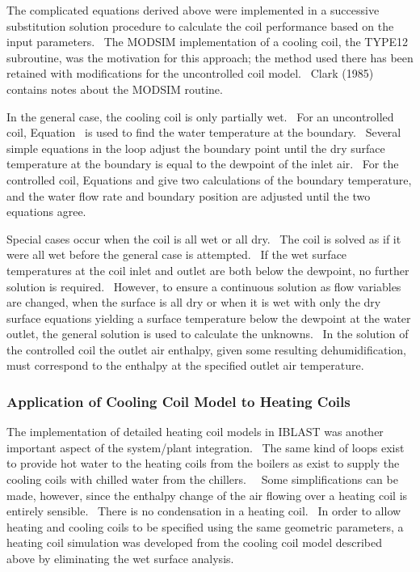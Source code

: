 The complicated equations derived above were implemented in a successive substitution solution procedure to calculate the coil performance based on the input parameters.~ The MODSIM implementation of a cooling coil, the TYPE12 subroutine, was the motivation for this approach; the method used there has been retained with modifications for the uncontrolled coil model.~ Clark (1985) contains notes about the MODSIM routine.

In the general case, the cooling coil is only partially wet.~ For an uncontrolled coil, Equation~ is used to find the water temperature at the boundary.~ Several simple equations in the loop adjust the boundary point until the dry surface temperature at the boundary is equal to the dewpoint of the inlet air.~ For the controlled coil, Equations and give two calculations of the boundary temperature, and the water flow rate and boundary position are adjusted until the two equations agree.

Special cases occur when the coil is all wet or all dry.~ The coil is solved as if it were all wet before the general case is attempted.~ If the wet surface temperatures at the coil inlet and outlet are both below the dewpoint, no further solution is required.~ However, to ensure a continuous solution as flow variables are changed, when the surface is all dry or when it is wet with only the dry surface equations yielding a surface temperature below the dewpoint at the water outlet, the general solution is used to calculate the unknowns.~ In the solution of the controlled coil the outlet air enthalpy, given some resulting dehumidification, must correspond to the enthalpy at the specified outlet air temperature.

\subsubsection{Application of Cooling Coil Model to Heating Coils}\label{application-of-cooling-coil-model-to-heating-coils}

The implementation of detailed heating coil models in IBLAST was another important aspect of the system/plant integration.~ The same kind of loops exist to provide hot water to the heating coils from the boilers as exist to supply the cooling coils with chilled water from the chillers.~~ Some simplifications can be made, however, since the enthalpy change of the air flowing over a heating coil is entirely sensible.~ There is no condensation in a heating coil.~ In order to allow heating and cooling coils to be specified using the same geometric parameters, a heating coil simulation was developed from the cooling coil model described above by eliminating the wet surface analysis.

